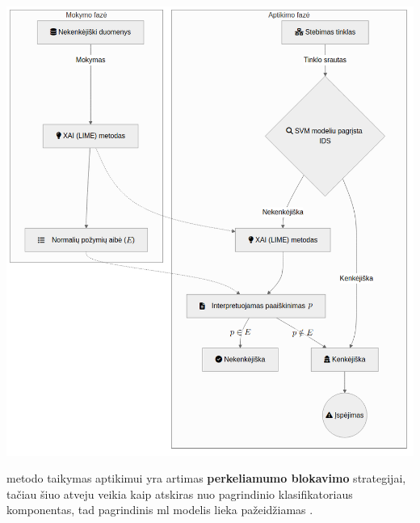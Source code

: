 \begin{minipage}{0.58\textwidth}
        \includegraphics[width=\textwidth]{images/ids.png}
        \label{fig:ids}
\end{minipage}

\break

\LIME metodo taikymas  aptikimui yra artimas \textbf{perkeliamumo blokavimo}  strategijai, tačiau šiuo atveju \LIME veikia kaip atskiras nuo pagrindinio klasifikatoriaus komponentas, tad pagrindinis \gls{ml} modelis lieka pažeidžiamas .